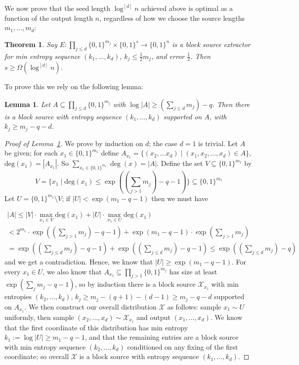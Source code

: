 \documentclass[11pt]{article}
\newtheorem{theorem}{Theorem}
\newtheorem{lemma}{Lemma}
\newcommand{\B}{\{0,1\}}
\begin{document}
We now prove that the seed length $\log^{[d]}n$ achieved above is optimal as a function of the output length $n$, regardless of how we choose the source lengths $m_1,\ldots,m_d$:
\begin{theorem}\label{thm:seed-length-lb}
Say $E: \prod_{j \leq d} \B^{m_j} \times \B^s \to \B^n$ is a block source extractor for min entropy sequence $(k_1,\ldots,k_d)$, $k_j \leq \frac{1}{2} m_j$, and error $\frac{1}{2}$. Then $s \geq \Omega(\log^{[d]}n)$. 
\end{theorem}

To prove this we rely on the following lemma:
\begin{lemma}\label{lem:CG-chain-rule}
Let $A \subseteq \prod_{j \leq d} \B^{m_j}$ with $\log|A|\geq (\sum_{j\leq d}m_j) - q$. Then there is a block source with entropy sequence $(k_1,\ldots,k_d)$ supported on $A$, with $k_j \geq m_j - q - d$.
\end{lemma}
\begin{proof}[Proof of Lemma~\ref{lem:CG-chain-rule}]
We prove by induction on $d$; the case $d=1$ is trivial. Let $A$ be given; for each $x_1 \in \B^{m_1}$ define $A_{x_1} = \{(x_2,\ldots x_d) \mid (x_1,x_2,\ldots,x_d) \in A\}$, $\mathrm{deg}(x_1) = |A_{x_1}| $. So $\sum_{x_1 \in \B^{m_1}} \deg(x) = |A|.$
Define the set $V \subseteq \B^{m_1}$ by 
\[
V = \{x_1 \mid \mathrm{deg}(x_1) \leq  \exp((\sum_{j>1} m_j) - q- 1) \} \subseteq \B^{m_1}
\]
Let $U = \B^{m_1} \setminus V$; if $|U| < \exp( m_1-q-1)$ then we must have

\begin{gather}
|A| \leq |V| \cdot \max_{x_1 \in V} \mathrm{deg}(x_1) + |U| \cdot \max_{x_1 \in U} \mathrm{deg}(x_1) \\
<  2^{m_1} \cdot \exp((\sum_{j>1} m_j) - q-1) + \exp(m_1-q-1) \cdot  \exp(\sum_{j > 1} m_j)\\
= \exp((\sum_{j \leq d}
 m_j) - q-1) + \exp((\sum_{j \leq d} m_j) - q-1) \leq \exp((\sum_{j \leq d} m_j)- q)
 \end{gather}
and we get a contradiction. Hence, we know that $|U| \geq \exp(m_1 - q - 1)$. For every $x_1 \in U$, we also know that $A_{x_1} \subseteq \prod_{j > 1} \B^{m_j}$ has size at least $\exp(\sum_j m_j - q-1)$, so by induction there is a block source $\mathcal{X}_{x_1}$ with min entropies $(k_2,\ldots,k_d)$, $k_j \geq m_j - (q+1) - (d-1) \geq m_j - q - d $ supported on $A_{x_1}$. We then construct our overall distribution $\mathcal{X}$ as follows: sample $x_1 \sim U$ uniformly, then sample $(x_2,\ldots,x_d) \sim \mathcal{X}_{x_1}$ and output $(x_1,\ldots,x_d)$. We know that the first coordinate of this distribution has min entropy $k_1:=\log |U| \geq  m_1 - q - 1 $, and that the remaining entries are a block source with min entropy sequence $(k_2,\ldots,k_d)$ conditioned on any fixing of the first coordinate; so overall $\mathcal{X}$ is a block source with entropy sequence $(k_1,\ldots,k_d)$. 
\end{proof}
\end{document}
